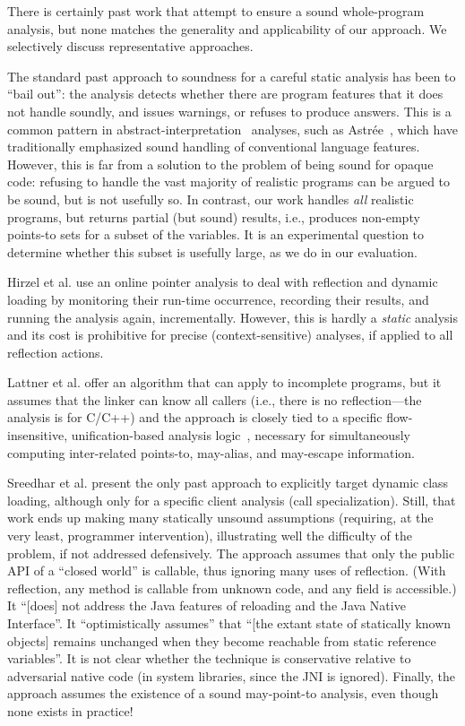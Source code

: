 There is certainly past work that attempt to ensure a sound whole-program analysis, but none matches the generality and applicability of our approach. We selectively discuss representative approaches.

The standard past approach to soundness for a careful static analysis has been to ``bail out'': the analysis detects whether there are program features that it does not handle soundly, and issues warnings, or refuses to produce answers. This is a common pattern in abstract-interpretation~\cite{popl:1977:Cousot} analyses, such as Astr\'{e}e~\cite{sas:2007:Delmas}, which have traditionally emphasized sound handling of conventional language features. However, this is far from a solution to the problem of being sound for opaque code: refusing to handle the vast majority of realistic programs can be argued to be sound, but is not usefully so. In contrast, our work handles \emph{all} realistic programs, but returns partial (but sound) results, i.e., produces non-empty points-to sets for a subset of the variables. It is an experimental question to determine whether this subset is usefully large, as we do in our evaluation.

Hirzel et al. \cite{ecoop:2004:Hirzel,article:2007:Hirzel} use an online pointer analysis to deal with reflection and dynamic loading by monitoring their run-time occurrence, recording their results, and running the analysis again, incrementally. However, this is hardly a \emph{static} analysis and its cost is prohibitive for precise (context-sensitive) analyses, if applied to all reflection actions.

Lattner et al. \cite{pldi:2007:Lattner} offer an algorithm that can apply to incomplete programs, but it assumes that the linker can know all callers (i.e., there is no reflection---the analysis is for C/C++) and the approach is closely tied to a specific flow-insensitive, unification-based analysis logic~\cite{popl:1996:Steensgaard}, necessary for simultaneously computing inter-related points-to, may-alias, and may-escape information.

Sreedhar et al. \cite{pldi:2000:Sreedhar} present the only past approach to explicitly target dynamic class loading, although only for a specific client analysis (call specialization). Still, that work ends up making many statically unsound assumptions (requiring, at the very least, programmer intervention), illustrating well the difficulty of the problem, if not addressed defensively. The approach assumes that only the public API of a ``closed world'' is callable, thus ignoring many uses of reflection. (With reflection, any method is callable from unknown code, and any field is accessible.) It ``[does] not address the Java features of reloading and the Java Native Interface''. It ``optimistically assumes'' that ``[the extant state of statically known objects] remains unchanged when they become reachable from static reference variables''. It is not clear whether the technique is conservative relative to adversarial native code (in system libraries, since the JNI is ignored). Finally, the approach assumes the existence of a sound may-point-to analysis, even though none exists in practice!


